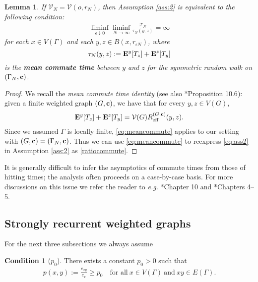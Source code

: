 \documentclass[11pt]{amsart}
\theoremstyle{plain}
\newtheorem{lemma}{Lemma}[section]
\theoremstyle{definition}
\newtheorem*{condition}{Condition}
\theoremstyle{remark}
\begin{document}
\begin{lemma}
If $\mathcal{V}_N = \mathcal{V}(o, r_N)$, then Assumption \ref{ass:2} is equivalent to the following condition:
\begin{align}
\label{ratiocommute}
\liminf_{\epsilon \downarrow 0} \liminf_{N\to\infty} \frac{\mathcal{T}_N}{{\tau_N}(y,z)} = \infty
\end{align}
for each $x\in V(\Gamma)$ and each $y,z\in B(x,r_{\epsilon N})$, where 
\[
{\tau_N}(y,z):={\bf E}^y[T_z] + {\bf E}^z[T_y]
\]
 is the \textbf{mean commute time} between $y$ and $z$ for the symmetric random walk on $(\Gamma_N,{\bf c})$.
 
\end{lemma}
\begin{proof}
We recall the \emph{mean commute time identity} \cite{CommuteTime} (see also \cite{MCBook}*{Proposition 10.6}): given a finite weighted graph $(G,{\bf c})$, we have that for every $y,z \in V(G)$,
\begin{align}
\label{eq:meancommute}
{\bf E}^y[T_z] + {\bf E}^z[T_y] = \mathcal{V}(G) R^{(G,{\bf c})}_{\rm eff}(y,z).
\end{align}
Since we assumed $\Gamma$ is locally finite, \eqref{eq:meancommute} applies to our setting with $(G,{\bf c})= (\Gamma_N, {\bf c})$. Thus we can use \eqref{eq:meancommute} to reexpress \eqref{eq:ass2} in Assumption \ref{ass:2} as \eqref{ratiocommute}.
\end{proof}

It is generally difficult to infer the asymptotics of commute times from those of hitting times; the analysis often proceeds on a case-by-case basis. For more discussions on this issue we refer the reader to \emph{e.g.\@} \cite{MCBook}*{Chapter 10} and \cite{AldousFill}*{Chapters 4--5}.

\subsection{Strongly recurrent weighted graphs} \label{sec:strongrec}

For the next three subsections we always assume

\begin{condition}[$p_0$]
\label{cond:ellipticity}
There exists a constant $p_0>0$ such that 
\begin{align}
p(x,y) :=\frac{c_{xy}}{c_x} \geq p_0 \quad \text{for all}~x\in V(\Gamma)~\text{and}~xy\in E(\Gamma).
\end{align}
\end{condition}
\end{document}
